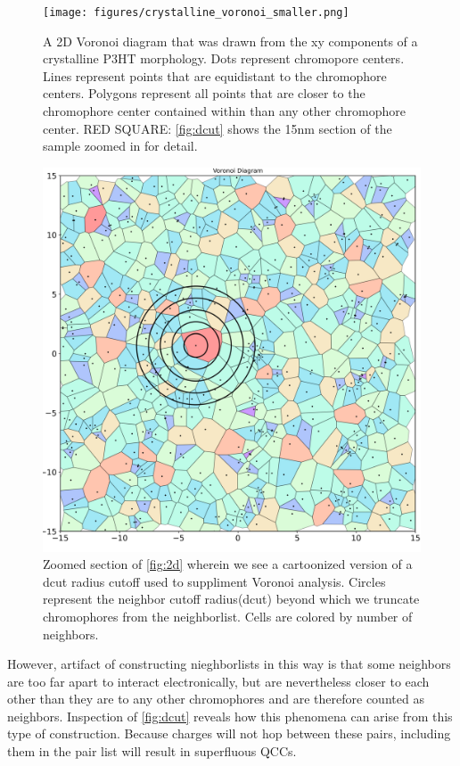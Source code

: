 \begin{figure}
  \center
  \texttt{[image: figures/crystalline\_voronoi\_smaller.png]} 
  \caption{A 2D Voronoi diagram that was drawn from the xy components of a crystalline P3HT morphology. Dots
    represent chromopore centers. Lines represent points that are equidistant to the chromophore centers.
    Polygons represent all points that are closer to the chromophore center contained within than any other
    chromophore center. RED SQUARE: \autoref{fig:dcut} shows the 15nm section of the sample zoomed in for
    detail.}
  \label{fig:2d}
\end{figure}
\begin{figure}
  \center
  \includegraphics[width=\linewidth]{figures/crystalline_voronoi_d_cut_circles.png} 
    \caption{Zoomed section of \autoref{fig:2d} wherein we see a cartoonized version of a dcut radius cutoff
    used to suppliment Voronoi analysis. Circles represent the neighbor cutoff
    radius(dcut) beyond which we truncate chromophores from the neighborlist.
    Cells are colored by number of neighbors.}
  \label{fig:dcut}
\end{figure}

However, artifact of constructing nieghborlists in this way is that some
neighbors are too far apart to interact electronically, but are nevertheless closer to each other than they
are to any other chromophores and are therefore counted as neighbors. 
Inspection of \autoref{fig:dcut} reveals how this phenomena can arise from this type of construction.
Because charges will not hop between these pairs, including them in the pair list will result in 
superfluous QCCs. 

